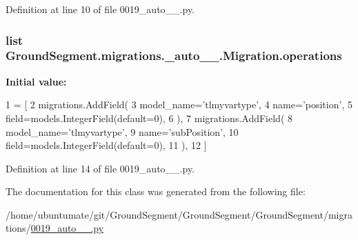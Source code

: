 Definition at line 10 of file 0019\+\_\+auto\+\_\+\_.\+py.

\hypertarget{class_ground_segment_1_1migrations_1_10019__auto__20161202__1004_1_1_migration_ae683ecfa5833a7a9ebc1804e95c91bfc}{}
\subsubsection[{operations}]{\setlength{\rightskip}{0pt plus 5cm}list Ground\+Segment.\+migrations.\+\_\+auto\+\_\+\_.\+Migration.\+operations\hspace{0.3cm}{\ttfamily [static]}}\label{class_ground_segment_1_1migrations_1_10019__auto__20161202__1004_1_1_migration_ae683ecfa5833a7a9ebc1804e95c91bfc}
{\bfseries Initial value\+:}
\begin{DoxyCode}
1 = [
2         migrations.AddField(
3             model\_name=\textcolor{stringliteral}{'tlmyvartype'},
4             name=\textcolor{stringliteral}{'position'},
5             field=models.IntegerField(default=0),
6         ),
7         migrations.AddField(
8             model\_name=\textcolor{stringliteral}{'tlmyvartype'},
9             name=\textcolor{stringliteral}{'subPosition'},
10             field=models.IntegerField(default=0),
11         ),
12     ]
\end{DoxyCode}


Definition at line 14 of file 0019\+\_\+auto\+\_\+\_.\+py.



The documentation for this class was generated from the following file\+:\begin{DoxyCompactItemize}
\item 
/home/ubuntumate/git/\+Ground\+Segment/\+Ground\+Segment/\+Ground\+Segment/migrations/\hyperlink{0019__auto__20161202__1004_8py}{0019\+\_\+auto\+\_\+\_.\+py}\end{DoxyCompactItemize}

